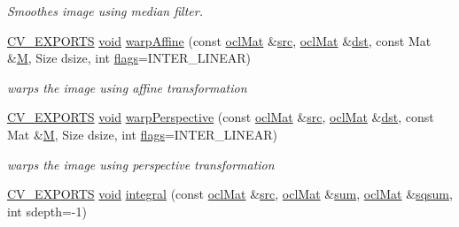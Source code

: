 \begin{DoxyCompactItemize}
\begin{DoxyCompactList}\small\item\em Smoothes image using median filter. \end{DoxyCompactList}\item 
\hyperlink{core_2types__c_8h_a1bf9f0e121b54272da02379cfccd0a2b}{C\-V\-\_\-\-E\-X\-P\-O\-R\-T\-S} \hyperlink{legacy_8hpp_a8bb47f092d473522721002c86c13b94e}{void} \hyperlink{namespacecv_1_1ocl_a7cc85c5db9a22327e51c9e13d869ce5f}{warp\-Affine} (const \hyperlink{classcv_1_1ocl_1_1oclMat}{ocl\-Mat} \&\hyperlink{legacy_8hpp_a371cd109b74033bc4366f584edd3dacc}{src}, \hyperlink{classcv_1_1ocl_1_1oclMat}{ocl\-Mat} \&\hyperlink{photo__c_8h_aed13e2a25279b24dc954073233fef7a5}{dst}, const Mat \&\hyperlink{tracking_8hpp_aa81fa9fd378ecf463757e9274a136e70}{M}, Size dsize, int \hyperlink{highgui__c_8h_ae51e3a2d4365e85db9630dd3ce9508db}{flags}=I\-N\-T\-E\-R\-\_\-\-L\-I\-N\-E\-A\-R)
\begin{DoxyCompactList}\small\item\em warps the image using affine transformation \end{DoxyCompactList}\item 
\hyperlink{core_2types__c_8h_a1bf9f0e121b54272da02379cfccd0a2b}{C\-V\-\_\-\-E\-X\-P\-O\-R\-T\-S} \hyperlink{legacy_8hpp_a8bb47f092d473522721002c86c13b94e}{void} \hyperlink{namespacecv_1_1ocl_a4314969aaeea7cbaeaafb2c459aa2a7a}{warp\-Perspective} (const \hyperlink{classcv_1_1ocl_1_1oclMat}{ocl\-Mat} \&\hyperlink{legacy_8hpp_a371cd109b74033bc4366f584edd3dacc}{src}, \hyperlink{classcv_1_1ocl_1_1oclMat}{ocl\-Mat} \&\hyperlink{photo__c_8h_aed13e2a25279b24dc954073233fef7a5}{dst}, const Mat \&\hyperlink{tracking_8hpp_aa81fa9fd378ecf463757e9274a136e70}{M}, Size dsize, int \hyperlink{highgui__c_8h_ae51e3a2d4365e85db9630dd3ce9508db}{flags}=I\-N\-T\-E\-R\-\_\-\-L\-I\-N\-E\-A\-R)
\begin{DoxyCompactList}\small\item\em warps the image using perspective transformation \end{DoxyCompactList}\item 
\hyperlink{core_2types__c_8h_a1bf9f0e121b54272da02379cfccd0a2b}{C\-V\-\_\-\-E\-X\-P\-O\-R\-T\-S} \hyperlink{legacy_8hpp_a8bb47f092d473522721002c86c13b94e}{void} \hyperlink{namespacecv_1_1ocl_a9b93be77bebdc28ef1161ce54396748f}{integral} (const \hyperlink{classcv_1_1ocl_1_1oclMat}{ocl\-Mat} \&\hyperlink{legacy_8hpp_a371cd109b74033bc4366f584edd3dacc}{src}, \hyperlink{classcv_1_1ocl_1_1oclMat}{ocl\-Mat} \&\hyperlink{namespacecv_1_1ocl_ac67634e76808649b1d6d569a1f2ef0ed}{sum}, \hyperlink{classcv_1_1ocl_1_1oclMat}{ocl\-Mat} \&\hyperlink{objdetect_8hpp_a9933dc7f409c9e987d15e1527589d3ae}{sqsum}, int sdepth=-\/1)

\end{DoxyCompactItemize}
